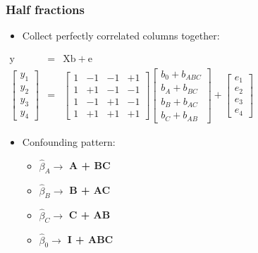 \begin{frame}\frametitle{Half fractions}
	\begin{itemize}
		\item	Collect perfectly correlated columns together:
	\end{itemize}
	$
	\begin{array}{rcl}
		\mathrm{y} &=& \mathrm{X} \mathrm{b} + \mathrm{e}\\
		\begin{bmatrix}
			y_1\\
			y_2\\
			y_3 \\
			y_4
		\end{bmatrix}
		&=&
		\begin{bmatrix}
			1 & -1 & -1 & +1 \\
			1 & +1 & -1 & -1 \\
			1 & -1 & +1 & -1 \\
			1 & +1 & +1 & +1
		\end{bmatrix}
		\begin{bmatrix}
			b_0 + b_{ABC} \\
			b_A + b_{BC} \\
			b_B + b_{AC} \\
			b_{C} + b_{AB}
		\end{bmatrix}
		+
		\begin{bmatrix}
			e_1\\
			e_2\\
			e_3 \\
			e_4
		\end{bmatrix}
	\end{array}
	$
	\begin{itemize}
		\item	Confounding pattern:
		\begin{itemize}
			\item	$\widehat{\beta}_A \rightarrow$ \textbf{A + BC}
			\item	$\widehat{\beta}_B \rightarrow$ \textbf{B + AC}
			\item	$\widehat{\beta}_C \rightarrow$ \textbf{C + AB}
			\item	$\widehat{\beta}_0 \rightarrow$ \textbf{I + ABC}
		\end{itemize}
	\end{itemize}
\end{frame}

